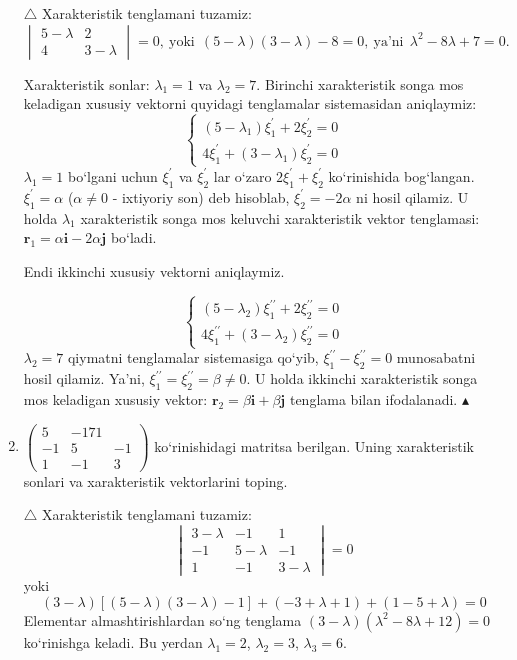 \begin{enumerate}
$\triangle$ Xarakteristik tenglamani tuzamiz:
$$\begin{vmatrix}
	5-\lambda&2\\4&3-\lambda
\end{vmatrix}=0,\ \mbox{yoki}\ \ (5-\lambda)(3-\lambda)-8=0,\ \mbox{ya'ni}\ \ \lambda^2-8\lambda+7=0.$$

Xarakteristik sonlar: $\lambda_1=1$ va $\lambda_2=7$. Birinchi xarakteristik songa mos keladigan xususiy vektorni quyidagi tenglamalar sistemasidan aniqlaymiz:
$$\begin{cases}
	(5-\lambda_1)\xi_{1}^{\prime}+2\xi_2^\prime=0\\
	4\xi_1^\prime+(3-\lambda_1)\xi_2^\prime=0
\end{cases}$$
$\lambda_1=1$ bo`lgani uchun $\xi_1^\prime$ va $\xi_2^\prime$ lar o`zaro $2\xi_1^\prime+\xi_{2}^{\prime}$ ko`rinishida bog`langan. $\xi_1^\prime=\alpha$ ($\alpha\ne0$ -  ixtiyoriy son) deb hisoblab, $\xi_2^\prime=-2\alpha$ ni hosil qilamiz. U holda $\lambda_1$ xarakteristik songa mos keluvchi xarakteristik vektor tenglamasi: $\textbf{r}_1=\alpha\textbf{i}-2\alpha\textbf{j}$  bo`ladi.

Endi ikkinchi xususiy vektorni aniqlaymiz.

$$\begin{cases}
	(5-\lambda_2)\xi_{1}^{\prime\prime}+2\xi_2^{\prime\prime}=0\\
	4\xi_1^{\prime\prime}+(3-\lambda_2)\xi_2^{\prime\prime}=0
\end{cases}$$
$\lambda_2=7$ qiymatni tenglamalar sistemasiga qo`yib, $\xi_{1}^{\prime\prime}-\xi_{2}^{\prime\prime}=0$ munosabatni hosil qilamiz. Ya'ni, $\xi_{1}^{\prime\prime}=\xi_{2}^{\prime\prime}=\beta\ne0$. U holda ikkinchi xarakteristik songa mos keladigan xususiy vektor: $\textbf{r}_2=\beta\textbf{i}+\beta\textbf{j}$ tenglama bilan ifodalanadi. $\blacktriangle$


\item $\begin{pmatrix}
	5&-171\\-1&5&-1\\1&-1&3
\end{pmatrix}$ ko`rinishidagi matritsa berilgan. Uning xarakteristik sonlari va xarakteristik vektorlarini toping.

$\triangle$ Xarakteristik tenglamani tuzamiz:
$$\begin{vmatrix}
	3-\lambda&-1&1\\
	-1&5-\lambda&-1\\
	1&-1&3-\lambda
\end{vmatrix}=0$$
yoki 
$$(3-\lambda)\left[(5-\lambda)(3-\lambda)-1\right]+(-3+\lambda+1)+(1-5+\lambda)=0$$
Elementar almashtirishlardan so`ng tenglama $(3-\lambda)(\lambda^2-8\lambda+12)=0$ ko`rinishga keladi. Bu yerdan $\lambda_1=2$, $\lambda_2=3$, $\lambda_3=6$.


\end{enumerate}
